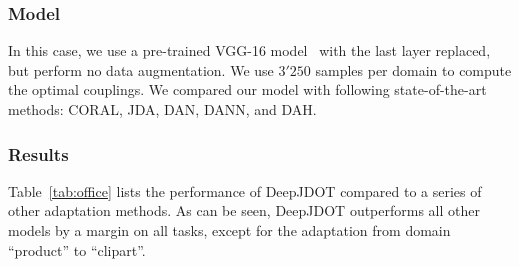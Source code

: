 \documentclass[runningheads]{llncs}
\begin{document}
\subsubsection*{Model} In this case, we use a pre-trained VGG-16 model~\cite{simonyan2014very} with the last layer replaced, but perform no data augmentation. We use $3'250$ samples per domain to compute the optimal couplings. We compared our model with following state-of-the-art methods: CORAL\cite{Sun2016}, JDA\cite{Long2013}, DAN\cite{long15}, DANN\cite{Ganin2016}, and DAH\cite{venkateswara2017}.

\subsubsection*{Results}

Table~\ref{tab:office} lists the performance of DeepJDOT compared to a series of other adaptation methods. As can be seen, DeepJDOT outperforms all other models by a margin on all tasks, except for the adaptation from domain ``product'' to ``clipart''.

\begin{table}[t]
\centering
\caption{Performance of DeepJDOT on the Office-Home dataset. ``Ar'' = artistic paintings, ``Cl'' = clipart, ``Pr'' = product, ``Rw'' = real-world images. Performance figures of competitive methods are reported from~\cite{venkateswara2017}.} \label{tab:office}\vspace{-0.1cm}
\scriptsize{
}
\end{table} 
\end{document}
